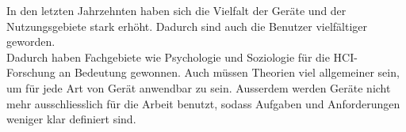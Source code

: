 
In den letzten Jahrzehnten haben sich die Vielfalt der Geräte und der Nutzungsgebiete stark erhöht. Dadurch sind auch die Benutzer vielfältiger geworden.\\

Dadurch haben Fachgebiete wie Psychologie und Soziologie für die HCI-Forschung an Bedeutung gewonnen. Auch müssen Theorien viel allgemeiner sein, um für jede Art von Gerät anwendbar zu sein. Ausserdem werden Geräte nicht mehr ausschliesslich für die Arbeit benutzt, sodass Aufgaben und Anforderungen weniger klar definiert sind.
